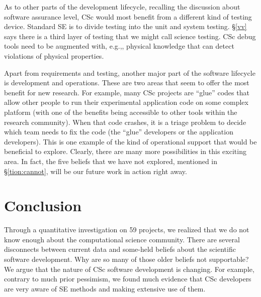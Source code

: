 \documentclass[conference,10pt]{IEEEtran}
\begin{document}

As to other parts of the development lifecycle,  recalling the discussion about software assurance level, CSc would most benefit from a different kind of testing device. Standard SE is to divide testing into the unit and system testing. \S\ref{vv} says there is a third layer of testing that we might call science testing. CSc debug tools need to be augmented with, e.g.,,  physical knowledge that can detect violations of physical properties.

Apart from requirements and testing, another major part of the software lifecycle is development and operations. These are two areas that seem to offer the most benefit for new research. For example, many CSc projects are ``glue'' codes that allow other people to run their experimental application code on some complex platform (with one of the benefits being accessible to other tools within the research community). When that code crashes, it is a triage problem to decide which team needs to fix the code (the ``glue'' developers or the application developers). This is one example of the kind of operational support that would be beneficial to explore. Clearly, there are many more possibilities in this exciting area. In fact, the five beliefs that we have not explored, mentioned in \S\ref{tion:cannot}, will be our future work in action right away. 




\section{Conclusion}

Through a quantitative investigation on 59 projects, we realized that we do not know enough about the computational science community. There are several disconnects between current data
and some-held beliefs about the scientific software development.
Why are so many of those older beliefs not supportable?
We argue that  the  nature of CSc software development is changing. 
For example, contrary to much prior pessimism, we found much evidence
that CSc developers are very
aware of SE methods and making
extensive use of them.
\end{document}
